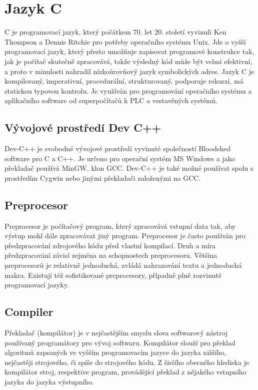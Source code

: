 \section{Jazyk C}
C je programovací jazyk, který počátkem 70. let 20. století vyvinuli Ken Thompson a Dennis Ritchie pro potřeby operačního systému Unix. Jde o vyšší programovací jazyk, který přesto umožňuje zapisovat programové konstrukce tak, jak je počítač skutečně zpracovává, takže výsledný kód může být velmi efektivní, a proto v minulosti nahradil nízkoúrovňový jazyk symbolických adres. Jazyk C je kompilovaný, imperativní, procedurální, strukturovaný, podporuje rekurzi, má statickou typovou kontrolu. Je využíván pro programování operačního systému a aplikačního software od superpočítačů k PLC a vestavěných systémů.

\subsection{Vývojové prostředí Dev C++}
Dev-C++ je svobodné vývojové prostředí vyvinuté společností Bloodshed software pro C a C++. Je určeno pro operační systém MS Windows a jako překladač používá MinGW, klon GCC. Dev-C++ je také možné používat spolu s prostředím Cygwin nebo jinými překladači založenými na GCC.

\subsection{Preprocesor}
Preprocesor je počítačový program, který zpracovává vstupní data tak, aby výstup mohl dále zpracovávat jiný program. Preprocesor je často používán pro předzpracování zdrojového kódu před vlastní kompilací. Druh a míra předzpracování závisí zejména na schopnostech preprocesoru. Většina preprocesorů je relativně jednoduchá, zvládá nahrazování textu a jednoduchá makra. Existují též sofistikované preprocesory, případně plně rozvinuté programovací jazyky.

\subsection{Compiler}
Překladač (kompilátor) je v nejčastějším smyslu slova softwarový nástroj používaný programátory pro vývoj softwaru. Kompilátor slouží pro překlad algoritmů zapsaných ve vyšším programovacím jazyce do jazyka nižšího, nejčastěji strojového, či spíše do strojového kódu. Z širšího obecného hlediska je kompilátor stroj, respektive program, provádějící překlad z nějakého vstupního jazyka do jazyka výstupního.

